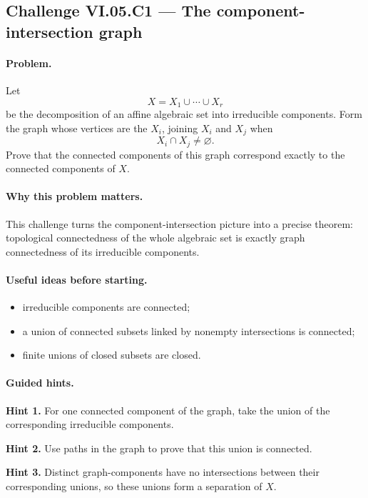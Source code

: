 \subsection*{Challenge VI.05.C1 --- The component-intersection graph}
\label{chal:vi-05-c1}

\paragraph{Problem.}
\label{prob:vi05-c1}
Let
\[
X=X_1\cup\cdots\cup X_r
\]
be the decomposition of an affine algebraic set into irreducible components.  Form the graph
whose vertices are the \(X_i\), joining \(X_i\) and \(X_j\) when
\[
X_i\cap X_j\neq\varnothing.
\]
Prove that the connected components of this graph correspond exactly to the connected
components of \(X\).

\ifdefined\FullProblemDossiers

\paragraph{Why this problem matters.}
This challenge turns the component-intersection picture into a precise theorem:
topological connectedness of the whole algebraic set is exactly graph connectedness of its
irreducible components.

\paragraph{Useful ideas before starting.}
\begin{itemize}
\item irreducible components are connected;
\item a union of connected subsets linked by nonempty intersections is connected;
\item finite unions of closed subsets are closed.
\end{itemize}

\paragraph{Guided hints.}
\textbf{Hint 1.} For one connected component of the graph, take the union of the
corresponding irreducible components.

\textbf{Hint 2.} Use paths in the graph to prove that this union is connected.

\textbf{Hint 3.} Distinct graph-components have no intersections between their corresponding
unions, so these unions form a separation of \(X\).

